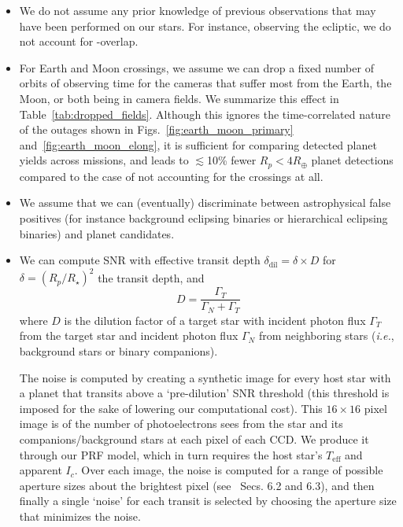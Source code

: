 \begin{itemize}
\begin{itemize}
          
	\end{itemize}

	\item We do not assume any prior knowledge of previous
          observations that may have been performed on our stars.  For
          instance, observing the ecliptic, we do not account for
          \tess\!-\ktwo overlap.
          
	\item For Earth and Moon crossings, we assume we can drop a
          fixed number of orbits of observing time for the cameras
          that suffer most from the Earth, the Moon, or both being in
          \tesss camera fields. We summarize this effect in
          Table~\ref{tab:dropped_fields}. Although this ignores the
          time-correlated nature of the outages shown in
          Figs.~\ref{fig:earth_moon_primary}
          and~\ref{fig:earth_moon_elong}, it is sufficient for
          comparing detected planet yields across missions, and
          leads to $\lesssim$10\% fewer $R_p<4R_\oplus$ planet 
          detections compared to the case of not accounting for the 
          crossings at all.
          
	\item We assume that we can (eventually) discriminate between
          astrophysical false positives (for instance background
          eclipsing binaries or hierarchical eclipsing binaries) and
          planet candidates.
          
	\item We can compute SNR with effective transit depth
          $\delta_\text{dil} = \delta \times D$ for
          $\delta=(R_p/R_\star)^2$ the transit depth, and
	  \begin{equation}
	D = \frac{\Gamma_T}{\Gamma_N + \Gamma_T}
	\label{eq:dilution}
	\end{equation}
	where $D$ is the dilution factor of a target star with
        incident photon flux $\Gamma_T$ from the target star and
        incident photon flux $\Gamma_N$ from neighboring stars 
        (\textit{i.e.}, background stars or binary companions).
	
	The noise is computed by creating a synthetic image for every
        host star with a planet that transits above a `pre-dilution'
        SNR threshold (this threshold is imposed for the sake of
        lowering our computational cost).  This $16\times16$ pixel
        image is of the number of photoelectrons \tess sees from the
        star and its companions/background stars at each pixel of each
        CCD.  We produce it through our PRF model, which in turn
        requires the host star's $T_\mathrm{eff}$ and apparent $I_c$.
        Over each image, the noise is computed for a range of possible
        aperture sizes about the brightest pixel
        (see~ Secs. 6.2 and 6.3), and then
        finally a single `noise' for each transit is selected by
        choosing the aperture size that minimizes the noise.

\end{itemize}
